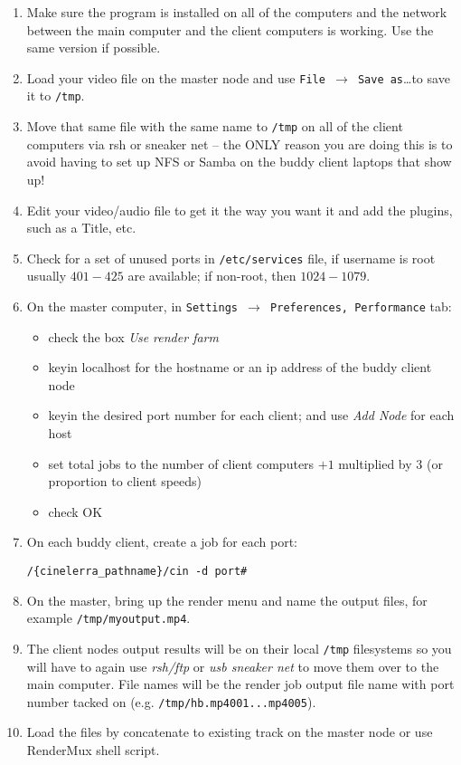 \begin{enumerate}
    \item Make sure the \CGG{} program is installed on all of the computers and the network between the
    main computer and the client computers is working.  Use the same version if possible.
    \item Load your video file on the master node and use \texttt{File $\rightarrow$ Save as}\dots  to save it to \texttt{/tmp}.
    \item Move that same file with the same name to \texttt{/tmp} on all of the client computers via rsh or sneaker net -- the ONLY reason you are doing this is to avoid having to set up NFS or Samba on the buddy client
    laptops that show up!
    \item Edit your video/audio file to get it the way you want it and add the plugins, such as a Title, etc.
    \item Check for a set of unused ports in \texttt{/etc/services} file, if username is root usually $401-425$ are
    available; if non-root, then $1024-1079$.
    \item On the master computer, in \texttt{Settings $\rightarrow$ Preferences, Performance} tab:
    \begin{itemize}
        \item check the box \textit{Use render farm}
        \item keyin localhost for the hostname or an ip address of the buddy client node
        \item keyin the desired port number for each client; and use \textit{Add Node} for each host
        \item set total jobs to the number of client computers $+1$ multiplied by $3$ (or proportion to client speeds)
        \item check OK
    \end{itemize}
    \item On each buddy client, create a job for each port:
    \begin{lstlisting}[style=sh]
/{cinelerra_pathname}/cin -d port#
    \end{lstlisting}
    \item On the master, bring up the render menu and name the output files, for example \texttt{/tmp/myoutput.mp4}.
    \item The client nodes output results will be on their local \texttt{/tmp} filesystems so you will have to again use
    \textit{rsh/ftp} or \textit{usb sneaker net} to move them over to the main computer.  File names will be the render
    job output file name with port number tacked on (e.g. \texttt{/tmp/hb.mp4001...mp4005}).
    \item Load the files by concatenate to existing track on the master node or use RenderMux shell script.
\end{enumerate}

